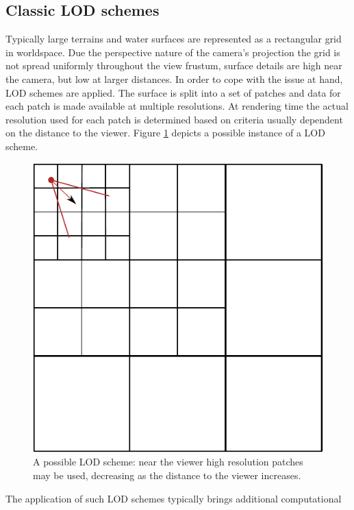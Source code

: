 \subsection{Classic LOD schemes}
Typically large terrains and water surfaces are represented as a rectangular
grid in worldspace. Due the perspective nature of the camera's projection the
grid is not spread uniformly throughout the view frustum, surface details are
high near the camera, but low at larger distances.  In order to cope with the issue at hand, LOD schemes are
applied. The surface is split into a set of patches and data for each patch is
made available at multiple resolutions. At rendering time the actual resolution
used for each patch is determined based on criteria usually dependent on the
distance to the viewer. Figure \ref{fig:lodscheme} depicts a possible instance
of a LOD scheme.
\begin{figure}[h]
\begin{center}
\includegraphics[scale=0.6]{Images/LODScheme.pdf}
\caption[LOD scheme]{A possible LOD scheme: near the viewer high resolution
patches may be used, decreasing as the distance to the viewer increases. }
\label{fig:lodscheme}
\end{center}
\end{figure}
The application of such LOD schemes typically brings additional computational
